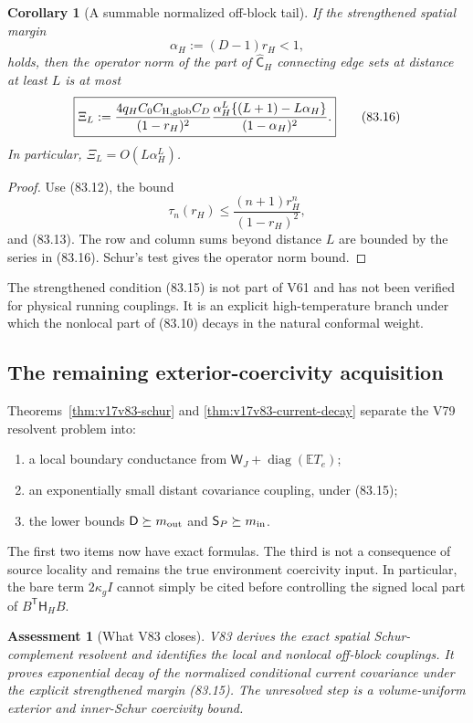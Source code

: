 \documentclass[11pt]{article}
\newtheorem{corollary}[theorem]{Corollary}
\newtheorem{assessment}[theorem]{Assessment}
\theoremstyle{remark}
\begin{document}
\begin{corollary}[A summable normalized off-block tail]
\label{cor:v17v83-summable}
If the strengthened spatial margin
\[
 \alpha_H:=(D-1)r_H<1,                            \tag{83.15}
\]
holds, then the operator norm of the part of
\(\widehat{\mathsf C}_H\) connecting edge sets at distance at least
\(L\) is at most
\[
\boxed{
 \Xi_L
 :=\frac{4q_HC_0C_{\rm H,glob}C_D}{(1-r_H)^2}
 \frac{\alpha_H^L\{(L+1)-L\alpha_H\}}
 {(1-\alpha_H)^2}.}                               \tag{83.16}
\]
In particular, \(\Xi_L=O(L\alpha_H^L)\).
\end{corollary}

\begin{proof}
Use (83.12), the bound
\[
 \tau_n(r_H)
 \leq\frac{(n+1)r_H^n}{(1-r_H)^2},               \tag{83.17}
\]
and (83.13).  The row and column sums beyond distance \(L\) are
bounded by the series in (83.16).  Schur's test gives the operator
norm bound.
\end{proof}

The strengthened condition (83.15) is not part of V61 and has not
been verified for physical running couplings.  It is an explicit
high-temperature branch under which the nonlocal part of (83.10)
decays in the natural conformal weight.

\subsection{The remaining exterior-coercivity acquisition}

Theorems~\ref{thm:v17v83-schur} and
\ref{thm:v17v83-current-decay} separate the V79 resolvent problem into:
\begin{enumerate}
\item a local boundary conductance from
      \(\mathsf W_J+\operatorname{diag}(\mathbb ET_e)\);
\item an exponentially small distant covariance coupling, under
      (83.15);
\item the lower bounds \(\mathsf D\succeq m_{\rm out}\) and
      \(\mathsf S_P\succeq m_{\rm in}\).
\end{enumerate}
The first two items now have exact formulas.  The third is not a
consequence of source locality and remains the true environment
coercivity input.  In particular, the bare term \(2\kappa_gI\) cannot
simply be cited before controlling the signed local part of
\(B^{\mathsf T}\mathsf H_HB\).

\begin{assessment}[What V83 closes]
\label{ass:v17v83-status}
V83 derives the exact spatial Schur-complement resolvent and identifies
the local and nonlocal off-block couplings.  It proves exponential
decay of the normalized conditional current covariance under the
explicit strengthened margin (83.15).  The unresolved step is a
volume-uniform exterior and inner-Schur coercivity bound.
\end{assessment}
\end{document}
